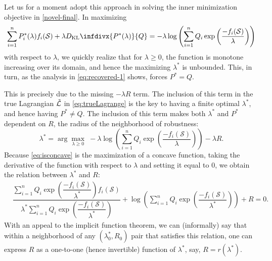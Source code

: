 \documentclass[letter,11pt]{article}
\newcommand{\argmax}{\arg\!\max}
\newcommand{\infdiv}{D_{\text{KL}}\infdivx}
\def\lp{\left(}
\def\rp{\right)}
\def\sS{\mathcal{S}}
\begin{document}
Let us for a moment adopt this approach in solving the inner minimization objective in \eqref{novel-final}. In maximizing
\begin{equation}
\begin{split}
\sum^n_{i=1} P^\ast_i(\lambda) f_i(\sS) + \lambda\infdiv{P^\ast(\lambda)}{Q}
 = -\lambda\log\lp\sum_{i=1}^nQ_i\exp{\lp\frac{-f_i(\sS)}{\lambda}\rp}\rp
\end{split}
\end{equation}
with respect to $\lambda$, we quickly realize that for $\lambda \geq 0$, the function is monotone increasing over its domain, and hence the maximizing $\lambda^\ast$ is unbounded. This, in turn, as the analysis in \eqref{eq:recovered-1} shows, forces $P^\ast = Q$.

This is precisely due to the missing $-\lambda R$ term. The inclusion of this term in the true Lagrangian $\Tilde{\mathcal{L}}$ in \eqref{eq:trueLagrange} is the key to having a finite optimal $\lambda^\ast$, and hence having $P^\ast \neq Q$. The inclusion of this term makes both $\lambda^\ast$ and $P^\ast$ dependent on $R$, the radius of the neighborhood of robustness:
\begin{equation}\label{eq:isconcave}
\lambda^\ast = \argmax_{\lambda\geq0} \;-\lambda\log\lp\sum_{i=1}^nQ_i\exp{\lp\frac{-f_i(\sS)}{\lambda}\rp}\rp -\lambda R.
\end{equation}
Because \eqref{eq:isconcave} is the maximization of a concave function, taking the derivative of the function with respect to $\lambda$ and setting it equal to $0$, we obtain the relation between $\lambda^\ast$ and $R$:
\begin{equation}\label{eq:therelation}
\begin{split}
&\dfrac{\sum_{i=1}^n Q_i \exp \lp\dfrac{-f_i(\sS)}{\lambda^\ast}\rp f_i(\sS)}{\lambda^\ast\sum_{i=1}^n Q_i \exp \lp\dfrac{-f_i(\sS)}{\lambda^\ast}\rp} + \log\lp \sum_{i=1}^n Q_i \exp \lp\dfrac{-f_i(\sS)}{\lambda^\ast} \rp\rp + R = 0.
\end{split}
\end{equation}
With an appeal to the implicit function theorem, we can (informally) say that within a neighborhood of any $(\lambda^\ast_0, R_0)$ pair that satisfies this relation, one can express $R$ as a one-to-one (hence invertible) function of $\lambda^\ast$, say, $R = r(\lambda^\ast)$.
\end{document}
